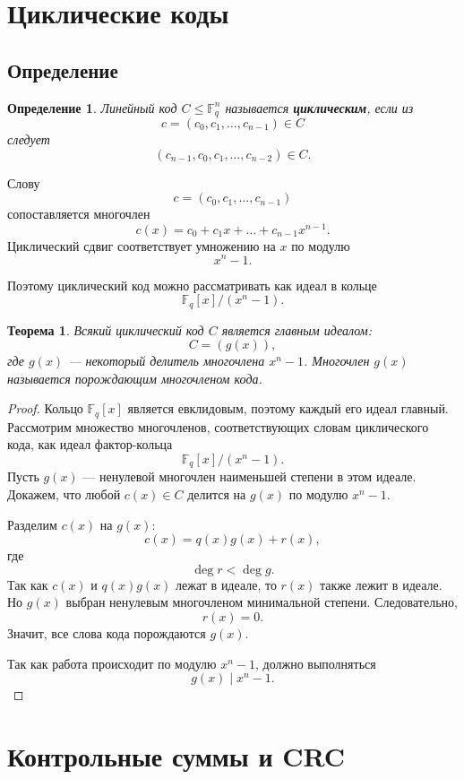 \documentclass[12pt,a4paper]{article}
\newtheorem{definition}{Определение}[section]
\newtheorem{theorem}{Теорема}[section]
\newcommand{\F}{\mathbb{F}}
\begin{document}
\section{Циклические коды}

\subsection{Определение}

\begin{definition}
Линейный код $C\le \F_q^n$ называется \textbf{циклическим}, если из
\[
    c=(c_0,c_1,\dots,c_{n-1})\in C
\]
следует
\[
    (c_{n-1},c_0,c_1,\dots,c_{n-2})\in C.
\]
\end{definition}

Слову
\[
    c=(c_0,c_1,\dots,c_{n-1})
\]
сопоставляется многочлен
\[
    c(x)=c_0+c_1x+\dots+c_{n-1}x^{n-1}.
\]
Циклический сдвиг соответствует умножению на $x$ по модулю
\[
    x^n-1.
\]

Поэтому циклический код можно рассматривать как идеал в кольце
\[
    \F_q[x]/(x^n-1).
\]

\begin{theorem}
Всякий циклический код $C$ является главным идеалом:
\[
    C=(g(x)),
\]
где $g(x)$ --- некоторый делитель многочлена $x^n-1$.
Многочлен $g(x)$ называется порождающим многочленом кода.
\end{theorem}

\begin{proof}
Кольцо $\F_q[x]$ является евклидовым, поэтому каждый его идеал главный.
Рассмотрим множество многочленов, соответствующих словам циклического кода, как идеал фактор-кольца
\[
    \F_q[x]/(x^n-1).
\]
Пусть $g(x)$ --- ненулевой многочлен наименьшей степени в этом идеале.
Докажем, что любой $c(x)\in C$ делится на $g(x)$ по модулю $x^n-1$.

Разделим $c(x)$ на $g(x)$:
\[
    c(x)=q(x)g(x)+r(x),
\]
где
\[
    \deg r<\deg g.
\]
Так как $c(x)$ и $q(x)g(x)$ лежат в идеале, то $r(x)$ также лежит в идеале.
Но $g(x)$ выбран ненулевым многочленом минимальной степени.
Следовательно,
\[
    r(x)=0.
\]
Значит, все слова кода порождаются $g(x)$.

Так как работа происходит по модулю $x^n-1$, должно выполняться
\[
    g(x)\mid x^n-1.
\]
\end{proof}

\section{Контрольные суммы и CRC}
\end{document}
